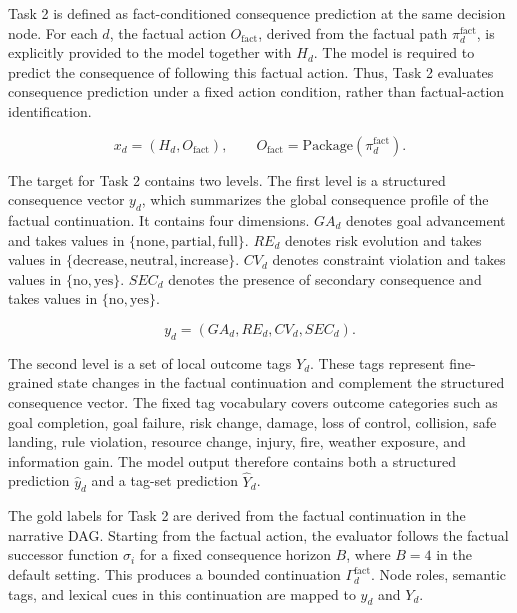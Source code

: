 \documentclass[pdflatex,sn-mathphys-num]{sn-jnl}%
\theoremstyle{thmstyleone}%
\theoremstyle{thmstyletwo}%
\theoremstyle{thmstylethree}%
\begin{document}
Task 2 is defined as fact-conditioned consequence prediction at the same decision node. For each $d$, the factual action $O_{\mathrm{fact}}$, derived from the factual path $\pi_d^{\mathrm{fact}}$, is explicitly provided to the model together with $H_d$. The model is required to predict the consequence of following this factual action. Thus, Task 2 evaluates consequence prediction under a fixed action condition, rather than factual-action identification.

\begin{equation}
x_d=(H_d,O_{\mathrm{fact}}),\qquad O_{\mathrm{fact}}=\mathrm{Package}(\pi_d^{\mathrm{fact}}).
\end{equation}

The target for Task 2 contains two levels. The first level is a structured consequence vector $y_d$, which summarizes the global consequence profile of the factual continuation. It contains four dimensions. $GA_d$ denotes goal advancement and takes values in $\{\mathrm{none},\mathrm{partial},\mathrm{full}\}$. $RE_d$ denotes risk evolution and takes values in $\{\mathrm{decrease},\mathrm{neutral},\mathrm{increase}\}$. $CV_d$ denotes constraint violation and takes values in $\{\mathrm{no},\mathrm{yes}\}$. $SEC_d$ denotes the presence of secondary consequence and takes values in $\{\mathrm{no},\mathrm{yes}\}$.

\begin{equation}
y_d=(GA_d,RE_d,CV_d,SEC_d).
\end{equation}

The second level is a set of local outcome tags $Y_d$. These tags represent fine-grained state changes in the factual continuation and complement the structured consequence vector. The fixed tag vocabulary covers outcome categories such as goal completion, goal failure, risk change, damage, loss of control, collision, safe landing, rule violation, resource change, injury, fire, weather exposure, and information gain. The model output therefore contains both a structured prediction $\hat{y}_d$ and a tag-set prediction $\hat{Y}_d$.

The gold labels for Task 2 are derived from the factual continuation in the narrative DAG. Starting from the factual action, the evaluator follows the factual successor function $\sigma_i$ for a fixed consequence horizon $B$, where $B=4$ in the default setting. This produces a bounded continuation $\Gamma_d^{\mathrm{fact}}$. Node roles, semantic tags, and lexical cues in this continuation are mapped to $y_d$ and $Y_d$.
\end{document}
